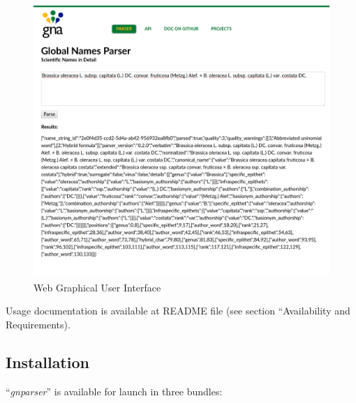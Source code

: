 \documentclass{bmcart}
\begin{document}
\begin{figure}[htbp]
  \begin{center}
    \caption{
      Web Graphical User Interface
    }\label{figure:webgui}
    \vspace{5mm}

    \includegraphics[scale=0.175]{images/web_gui.png}
  \end{center}
\end{figure}

Usage documentation is available at README file (see section ``Availability and
Requirements).

\subsection*{Installation}

``\textit{gnparser}'' is available for launch in three bundles:
\end{document}
